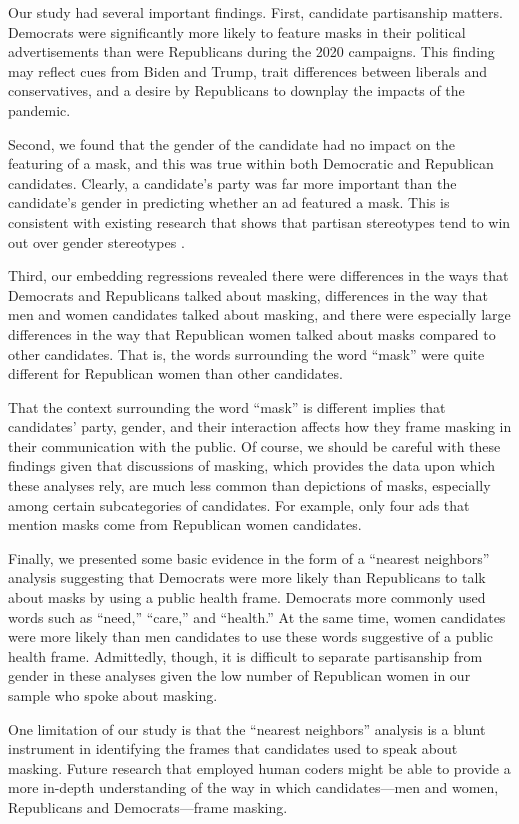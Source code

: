 Our study had several important findings.  First, candidate partisanship matters.  Democrats were significantly more likely to feature masks in their political advertisements than were Republicans during the 2020 campaigns. This finding may reflect cues from Biden and Trump, trait differences between liberals and conservatives, and a desire by Republicans to downplay the impacts of the pandemic.

Second, we found that the gender of the candidate had no impact on the featuring of a mask, and this was true within both Democratic and Republican candidates.  Clearly, a candidate's party was far more important than the candidate's gender in predicting whether an ad featured a mask. This is consistent with existing research that shows that partisan stereotypes tend to win out over gender stereotypes \parencite{hayes2011gender}.

Third, our embedding regressions revealed there were differences in the ways that Democrats and Republicans talked about masking, differences in the way that men and women candidates talked about masking, and there were especially large differences in the way that Republican women talked about masks compared to other candidates. That is, the words surrounding the word ``mask'' were quite different for Republican women than other candidates.

That the context surrounding the word ``mask'' is different implies that candidates' party, gender, and their interaction affects how they frame masking in their communication with the public.  Of course, we should be careful with these findings given that discussions of masking, which provides the data upon which these analyses rely, are much less common than depictions of masks, especially among certain subcategories of candidates.  For example, only four ads that mention masks come from Republican women candidates.

Finally, we presented some basic evidence in the form of a ``nearest neighbors'' analysis suggesting that Democrats were more likely than Republicans to talk about masks by using a public health frame. Democrats more commonly used words such as ``need,'' ``care,'' and ``health.'' At the same time, women candidates were more likely than men candidates to use these words suggestive of a public health frame.  Admittedly, though, it is difficult to separate partisanship from gender in these analyses given the low number of Republican women in our sample who spoke about masking.

One limitation of our study is that the ``nearest neighbors'' analysis is a blunt instrument in identifying the frames that candidates used to speak about masking.  Future research that employed human coders might be able to provide a more in-depth understanding of the way in which candidates---men and women, Republicans and Democrats---frame masking.

